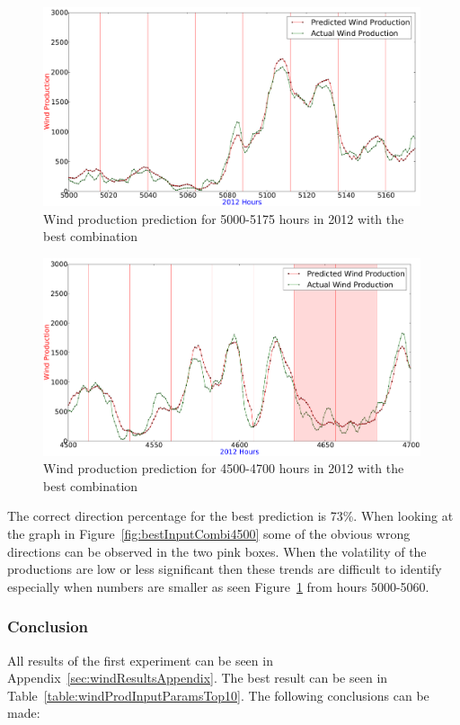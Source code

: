 \begin{figure}[H]
\centering
\includegraphics[width=0.99\textwidth]{billeder/bestInputParameterLowNumbers.png}
\caption{Wind production prediction for 5000-5175 hours in 2012 with the best combination}
\label{fig:bestInputParameterLowNumbers}
\end{figure} 

\begin{figure}[H]
\centering
\includegraphics[width=0.99\textwidth]{billeder/bestInputCombi4500-4700.png}
\caption{Wind production prediction for 4500-4700 hours in 2012 with the best combination}
\label{fig:bestInputCombi4500-4700}
\end{figure} 

The correct direction percentage for the best prediction is 73\%. When looking at the graph in Figure~\ref{fig:bestInputCombi4500} some of the obvious wrong directions can be observed in the two pink boxes. When the volatility of the productions are low or less significant then these trends are difficult to identify especially when numbers are smaller as seen Figure~\ref{fig:bestInputParameterLowNumbers} from hours 5000-5060.

\subsubsection{Conclusion}
All results of the first experiment can be seen in Appendix~\ref{sec:windResultsAppendix}. The best result can be seen in Table~\ref{table:windProdInputParamsTop10}. The following conclusions can be made: 

